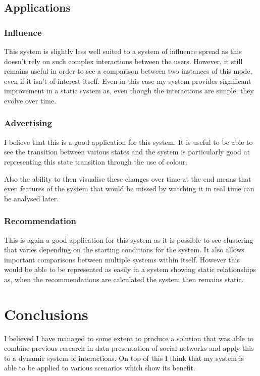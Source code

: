 \documentclass[12pt,a4paper]{article}
\begin{document}
\subsection{Applications}

\subsubsection{Influence}

This system is slightly less well suited to a system of influence spread as this doesn't rely on such complex interactions between the users. However, it still remains useful in order to see a comparison between two instances of this mode, even if it isn't of interest itself. Even in this case my system provides significant improvement in a static system as, even though the interactions are simple, they evolve over time.

\subsubsection{Advertising}

I believe that this is a good application for this system. It is useful to be able to see the transition between various states and the system is particularly good at representing this state transition through the use of colour.

Also the ability to then visualise these changes over time at the end means that even features of the system that would be missed by watching it in real time can be analysed later.

\subsubsection{Recommendation}

This is again a good application for this system as it is possible to see clustering that varies depending on the starting conditions for the system. It also allows important comparisons between multiple systems within itself. However this would be able to be represented as easily in a system showing static relationships as, when the recommendations are calculated the system then remains static.

\section{Conclusions}

I believed I have managed to some extent to produce a solution that was able to combine previous research in data presentation of social networks and apply this to a dynamic system of interactions. On top of this I think that my system is able to be applied to various scenarios which show its benefit.
\end{document}
